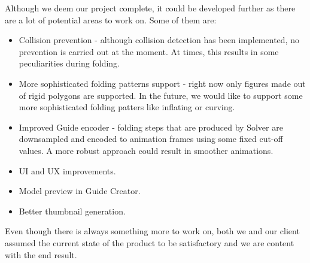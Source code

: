 Although we deem our project complete, it could be developed further as there are a lot of potential areas to work on.
Some of them are:

\begin{itemize}
	\item Collision prevention - although collision detection has been implemented, no prevention is carried out at the moment. At times, this results in some peculiarities during folding.
	\item More sophisticated folding patterns support - right now only figures made out of rigid polygons are supported. In the future, we would like to support some more sophisticated folding patters like inflating or curving.
	\item Improved Guide encoder - folding steps that are produced by Solver are downsampled and encoded to animation frames using some fixed cut-off values. A more robust approach could result in smoother animations.
	\item UI and UX improvements.
	\item Model preview in Guide Creator.
	\item Better thumbnail generation.
\end{itemize}

Even though there is always something more to work on,
both we and our client assumed the current state of the product to be
satisfactory and we are content with the end result.

